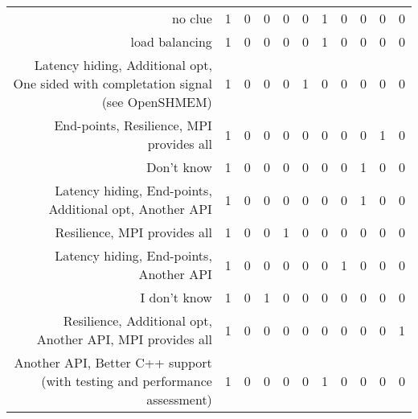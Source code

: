 {\begin{landscape}
\begin{longtable}[htb]{r|c|c|c|c|c|c|c|c|c|c}
{no clue} & 1 & 0 & 0 & 0 & 0 & 1 & 0 & 0 & 0 & 0 \\%
{load balancing} & 1 & 0 & 0 & 0 & 0 & 1 & 0 & 0 & 0 & 0 \\%
{Latency hiding, Additional opt, One sided with completation signal (see OpenSHMEM)} & 1 & 0 & 0 & 0 & 1 & 0 & 0 & 0 & 0 & 0 \\%
{End-points, Resilience, MPI provides all} & 1 & 0 & 0 & 0 & 0 & 0 & 0 & 0 & 1 & 0 \\%
{Don't know} & 1 & 0 & 0 & 0 & 0 & 0 & 0 & 1 & 0 & 0 \\%
{Latency hiding, End-points, Additional opt, Another API} & 1 & 0 & 0 & 0 & 0 & 0 & 0 & 1 & 0 & 0 \\%
{Resilience, MPI provides all} & 1 & 0 & 0 & 1 & 0 & 0 & 0 & 0 & 0 & 0 \\%
{Latency hiding, End-points, Another API} & 1 & 0 & 0 & 0 & 0 & 0 & 1 & 0 & 0 & 0 \\%
{I don't know} & 1 & 0 & 1 & 0 & 0 & 0 & 0 & 0 & 0 & 0 \\%
{Resilience, Additional opt, Another API, MPI provides all} & 1 & 0 & 0 & 0 & 0 & 0 & 0 & 0 & 0 & 1 \\%
{Another API, Better C++ support (with testing and performance assessment)} & 1 & 0 & 0 & 0 & 0 & 1 & 0 & 0 & 0 & 0 \\%
\hline%
\end{longtable}%
\end{landscape}}%
\clearpage%
